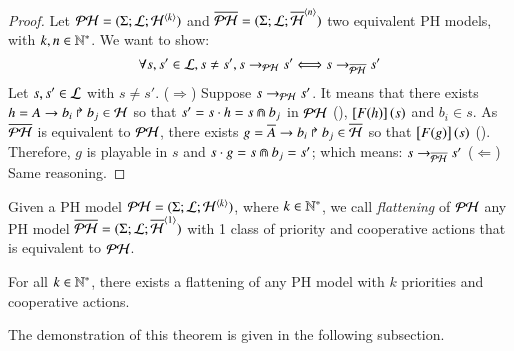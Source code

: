 \begin{proof}
  Let $\mathcal{PH} = (\Sigma; \mathcal{L}; \mathcal{H}^{\langle k \rangle})$ and $\overline{\mathcal{PH}} = (\Sigma; \mathcal{L}; \overline{\mathcal{H}}^{\langle n \rangle})$
  two equivalent PH models, with $k, n \in \mathbb{N}^*$.
  We want to show:
  $$\forall s, s' \in \mathcal{L}, s \neq s', s \rightarrow_{\mathcal{PH}} s' \Longleftrightarrow s \rightarrow_{\overline{\mathcal{PH}}} s' $$
  Let $s, s' \in \mathcal{L}$ with $s \neq s'$.
  ($\Rightarrow$) Suppose $s \rightarrow_{\mathcal{PH}} s'$.
  It means that there exists $h = A\rightarrow b_i\Rsh b_j \in \mathcal{H}$ so that $s' = s \cdot h = s \Cap b_j$
  in $\mathcal{PH}$ (), \ie $\left[F(h)\right](s)$ and $b_i \in s$.
  As $\overline{\mathcal{PH}}$ is equivalent to $\mathcal{PH}$,
  there exists $g = \overline{A}\rightarrow b_i\Rsh b_j \in \overline{\mathcal{H}}$ so that $\left[F(g)\right](s)$ ().
  Therefore, $g$ is playable in $s$ and $s \cdot g = s \Cap b_j = s'$;
  which means: $s \rightarrow_{\overline{\mathcal{PH}}} s'$
  ($\Leftarrow$) Same reasoning.
\end{proof}

\begin{definition}[Flattening]
  Given a PH model $\mathcal{PH} = (\Sigma; \mathcal{L}; \mathcal{H}^{\langle k \rangle})$, where $k \in \mathbb{N}^*$,
  we call \emph{flattening} of $\mathcal{PH}$ any PH model $\overline{\mathcal{PH}} = (\Sigma; \mathcal{L}; \overline{\mathcal{H}}^{\langle 1 \rangle})$
  with 1 class of priority and cooperative actions that is equivalent to $\mathcal{PH}$.
\end{definition}

\begin{theorem}\label{th:exists-flattening}
  For all $k \in \mathbb{N}^*$, there exists a flattening of any PH model with $k$ priorities and cooperative actions.
\end{theorem}

The demonstration of this theorem is given in the following subsection.
